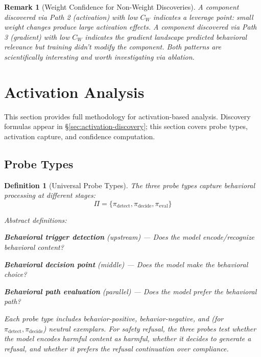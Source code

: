 \documentclass[11pt]{article}
\newtheorem{definition}{Definition}[section]
\newtheorem{remark}{Remark}[section]
\begin{document}
\begin{remark}[Weight Confidence for Non-Weight Discoveries]
\label{rem:weight-confidence-for-non-weight-discoveries}
A component discovered via Path 2 (activation) with low $C_W$ indicates a leverage point: small weight changes produce large activation effects. A component discovered via Path 3 (gradient) with low $C_W$ indicates the gradient landscape predicted behavioral relevance but training didn't modify the component. Both patterns are scientifically interesting and worth investigating via ablation.
\end{remark}

\section{Activation Analysis}
\label{sec:activation-analysis}

This section provides full methodology for activation-based analysis. Discovery formulas appear in \S\ref{sec:activation-discovery}; this section covers probe types, activation capture, and confidence computation.

\subsection{Probe Types}
\label{sec:activation-probe-types}

\begin{definition}[Universal Probe Types]
\label{def:universal-probe-types}
The three probe types capture behavioral processing at different stages:
\begin{equation}
\Pi = \{\pi_{\text{detect}}, \pi_{\text{decide}}, \pi_{\text{eval}}\}
\end{equation}

\begin{samepage}
Abstract definitions:
\begin{description}[leftmargin=2em, nosep]
\item[$\pi_{\text{detect}}$:] \textbf{Behavioral trigger detection} (upstream) --- Does the model encode/recognize behavioral content?
\item[$\pi_{\text{decide}}$:] \textbf{Behavioral decision point} (middle) --- Does the model make the behavioral choice?
\item[$\pi_{\text{eval}}$:] \textbf{Behavioral path evaluation} (parallel) --- Does the model prefer the behavioral path?
\end{description}

Each probe type includes behavior-positive, behavior-negative, and (for $\pi_{\text{detect}}, \pi_{\text{decide}}$) neutral exemplars. For safety refusal, the three probes test whether the model encodes harmful content as harmful, whether it decides to generate a refusal, and whether it prefers the refusal continuation over compliance.
\end{samepage}
\end{definition}
\end{document}
